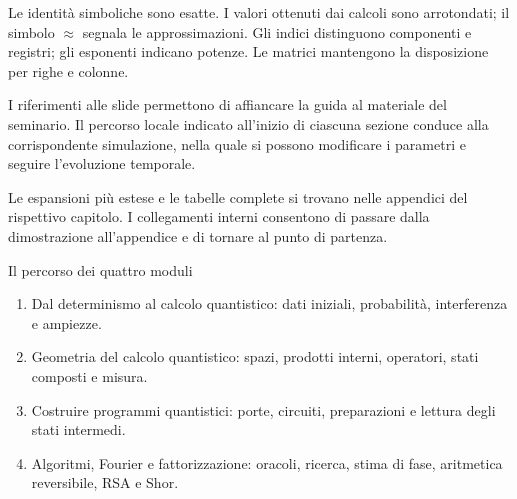 Le identità simboliche sono esatte. I valori ottenuti dai calcoli sono
arrotondati; il simbolo \(\approx\) segnala le approssimazioni. Gli indici
distinguono componenti e registri; gli esponenti indicano potenze. Le matrici
mantengono la disposizione per righe e colonne.

I riferimenti alle slide permettono di affiancare la guida al materiale del
seminario. Il percorso locale indicato all’inizio di ciascuna sezione conduce
alla corrispondente simulazione, nella quale si possono modificare i parametri
e seguire l’evoluzione temporale.

Le espansioni più estese e le tabelle complete si trovano nelle appendici del
rispettivo capitolo. I collegamenti interni consentono di passare dalla
dimostrazione all’appendice e di tornare al punto di partenza.

\vspace{7mm}
{\sffamily\color{Accent}Il percorso dei quattro moduli\par}
\begin{enumerate}[leftmargin=6mm,itemsep=4pt]
 \item Dal determinismo al calcolo quantistico: dati iniziali, probabilità,
       interferenza e ampiezze.
 \item Geometria del calcolo quantistico: spazi, prodotti interni, operatori,
       stati composti e misura.
 \item Costruire programmi quantistici: porte, circuiti, preparazioni e
       lettura degli stati intermedi.
 \item Algoritmi, Fourier e fattorizzazione: oracoli, ricerca, stima di fase,
       aritmetica reversibile, RSA e Shor.
\end{enumerate}
\clearpage
